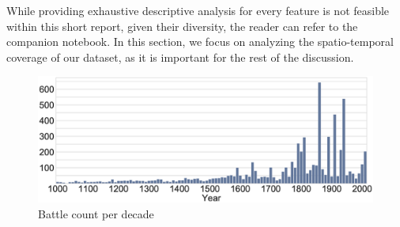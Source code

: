 While providing exhaustive descriptive analysis for every feature is not feasible within this short report, given their diversity, the reader can refer to the companion notebook. In this section, we focus on analyzing the spatio-temporal coverage of our dataset, as it is important for the rest of the discussion.

\begin{figure}[h]
	\centering
	\includegraphics[width=\linewidth]{figures/temporal_coverage.eps}
	\caption{Battle count per decade}
	\label{temporal_coverage}
\end{figure}

